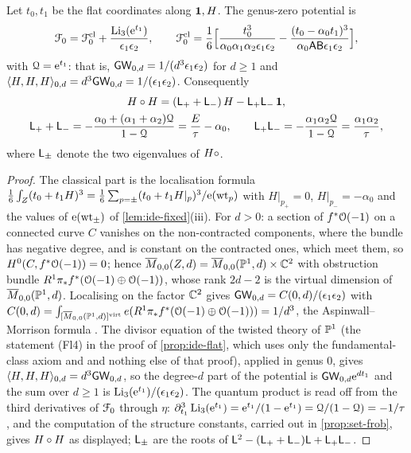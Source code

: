 \begin{lem}
\label{lem:ide-g0}
Let $t_0,t_1$ be the flat coordinates along $\mathbf{1},H$. The genus-zero potential is
\[
\mathcal{F}_0=\mathcal{F}_0^{\mathrm{cl}}+\frac{\operatorname{Li}_3(\mathrm{e}^{t_1})}{\epsilon_1\epsilon_2},\qquad
\mathcal{F}_0^{\mathrm{cl}}=\frac16\Big[\frac{t_0^3}{\alpha_0\alpha_1\alpha_2\epsilon_1\epsilon_2}-\frac{(t_0-\alpha_0t_1)^3}{\alpha_0\mathsf{A}\mathsf{B}\epsilon_1\epsilon_2}\Big],
\]
with $\mathcal{Q}=\mathrm{e}^{t_1}$: that is, $\mathsf{GW}_{0,d}=1/(d^3\epsilon_1\epsilon_2)$ for $d\geq 1$ and $\langle H,H,H\rangle_{0,d}=d^3\mathsf{GW}_{0,d}=1/(\epsilon_1\epsilon_2)$. Consequently
\begin{gather*}
H\circ H=(\mathsf{L}_++\mathsf{L}_-)\,H-\mathsf{L}_+\mathsf{L}_-\,\mathbf{1},\\
\mathsf{L}_++\mathsf{L}_-=-\frac{\alpha_0+(\alpha_1+\alpha_2)\mathcal{Q}}{1-\mathcal{Q}}=\frac{E}{\tau}-\alpha_0,\qquad
\mathsf{L}_+\mathsf{L}_-=-\frac{\alpha_1\alpha_2\mathcal{Q}}{1-\mathcal{Q}}=\frac{\alpha_1\alpha_2}{\tau},
\end{gather*}
where $\mathsf{L}_\pm$ denote the two eigenvalues of $H\circ$.
\end{lem}
\begin{proof}
The classical part is the localisation formula $\frac16\int_Z(t_0+t_1H)^3=\frac16\sum_{p=\pm}(t_0+t_1H|_p)^3/\mathrm{e}(\mathrm{wt}_p)$ with $H|_{p_+}=0$, $H|_{p_-}=-\alpha_0$ and the values of $\mathrm{e}(\mathrm{wt}_\pm)$ of \cref{lem:ide-fixed}(iii). For $d>0$: a section of $f^*\mathcal{O}(-1)$ on a connected curve $C$ vanishes on the non-contracted components, where the bundle has negative degree, and is constant on the contracted ones, which meet them, so $H^0(C,f^*\mathcal{O}(-1))=0$; hence $\overline{M}_{0,0}(Z,d)=\overline{M}_{0,0}(\mathbb{P}^1,d)\times\mathbb{C}^2$ with obstruction bundle $R^1\pi_*f^*(\mathcal{O}(-1)\oplus\mathcal{O}(-1))$, whose rank $2d-2$ is the virtual dimension of $\overline{M}_{0,0}(\mathbb{P}^1,d)$. Localising on the factor $\mathbb{C}^2$ gives $\mathsf{GW}_{0,d}=C(0,d)/(\epsilon_1\epsilon_2)$ with $C(0,d)=\int_{[\overline{M}_{0,0}(\mathbb{P}^1,d)]^{\mathrm{virt}}}e(R^1\pi_*f^*(\mathcal{O}(-1)\oplus\mathcal{O}(-1)))=1/d^3$, the Aspinwall--Morrison formula \cite[p.~3]{FP00}. The divisor equation of the twisted theory of $\mathbb{P}^1$ (the statement (Fl4) in the proof of \cref{prop:ide-flat}, which uses only the fundamental-class axiom and \cite[App.~1~(iv)]{CG07} and nothing else of that proof), applied in genus $0$, gives $\langle H,H,H\rangle_{0,d}=d^3\mathsf{GW}_{0,d}$, so the degree-$d$ part of the potential is $\mathsf{GW}_{0,d}\mathrm{e}^{dt_1}$ and the sum over $d\geq 1$ is $\operatorname{Li}_3(\mathrm{e}^{t_1})/(\epsilon_1\epsilon_2)$. The quantum product is read off from the third derivatives of $\mathcal{F}_0$ through $\eta$: $\partial_{t_1}^3\operatorname{Li}_3(\mathrm{e}^{t_1})=\mathrm{e}^{t_1}/(1-\mathrm{e}^{t_1})=\mathcal{Q}/(1-\mathcal{Q})=-1/\tau$, and the computation of the structure constants, carried out in \cref{prop:set-frob}, gives $H\circ H$ as displayed; $\mathsf{L}_\pm$ are the roots of $\mathsf{L}^2-(\mathsf{L}_++\mathsf{L}_-)\mathsf{L}+\mathsf{L}_+\mathsf{L}_-$.
\end{proof}

